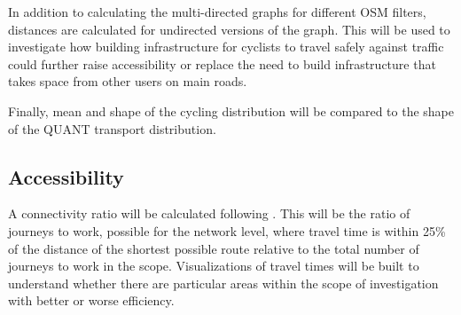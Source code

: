 In addition to calculating the multi-directed graphs for different OSM filters, distances are calculated for undirected versions of the graph. This will be used to investigate how building infrastructure for cyclists to travel safely against traffic could further raise accessibility or replace the need to build infrastructure that takes space from other users on main roads. 

Finally, mean and shape of the cycling distribution will be compared to the shape of the QUANT transport distribution. 

\subsection{Accessibility}

A connectivity ratio will be calculated following \cite{furth2016network}. This will be the ratio of journeys to work, possible for the network level, where travel time is within 25\% of  the distance of the shortest possible route relative to the total number of journeys to work in the scope. Visualizations of travel times will be built to understand whether there are particular areas within the scope of investigation with better or worse efficiency. 
